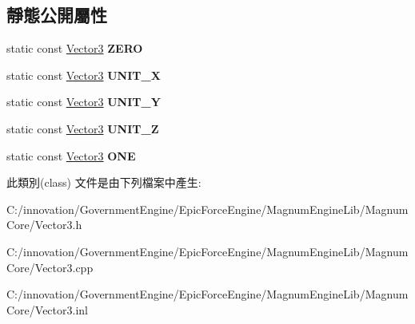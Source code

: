 \subsection*{靜態公開屬性}
\begin{DoxyCompactItemize}
\item 
static const \hyperlink{class_i_dream_sky_1_1_vector3}{Vector3} {\bfseries Z\+E\+RO}\hypertarget{class_i_dream_sky_1_1_vector3_ac97e400f736c7bb2240a6ca960290574}{}\label{class_i_dream_sky_1_1_vector3_ac97e400f736c7bb2240a6ca960290574}

\item 
static const \hyperlink{class_i_dream_sky_1_1_vector3}{Vector3} {\bfseries U\+N\+I\+T\+\_\+X}\hypertarget{class_i_dream_sky_1_1_vector3_a9012f68996a3dfebcd55a339d92a3cd0}{}\label{class_i_dream_sky_1_1_vector3_a9012f68996a3dfebcd55a339d92a3cd0}

\item 
static const \hyperlink{class_i_dream_sky_1_1_vector3}{Vector3} {\bfseries U\+N\+I\+T\+\_\+Y}\hypertarget{class_i_dream_sky_1_1_vector3_abddc6181d833976bd68b53805ee84a68}{}\label{class_i_dream_sky_1_1_vector3_abddc6181d833976bd68b53805ee84a68}

\item 
static const \hyperlink{class_i_dream_sky_1_1_vector3}{Vector3} {\bfseries U\+N\+I\+T\+\_\+Z}\hypertarget{class_i_dream_sky_1_1_vector3_a0e6f94f0b5eba93ab05ce29cafffd584}{}\label{class_i_dream_sky_1_1_vector3_a0e6f94f0b5eba93ab05ce29cafffd584}

\item 
static const \hyperlink{class_i_dream_sky_1_1_vector3}{Vector3} {\bfseries O\+NE}\hypertarget{class_i_dream_sky_1_1_vector3_ae1306872637de95c395268d326b4c4dc}{}\label{class_i_dream_sky_1_1_vector3_ae1306872637de95c395268d326b4c4dc}

\end{DoxyCompactItemize}


此類別(class) 文件是由下列檔案中產生\+:\begin{DoxyCompactItemize}
\item 
C\+:/innovation/\+Government\+Engine/\+Epic\+Force\+Engine/\+Magnum\+Engine\+Lib/\+Magnum\+Core/Vector3.\+h\item 
C\+:/innovation/\+Government\+Engine/\+Epic\+Force\+Engine/\+Magnum\+Engine\+Lib/\+Magnum\+Core/Vector3.\+cpp\item 
C\+:/innovation/\+Government\+Engine/\+Epic\+Force\+Engine/\+Magnum\+Engine\+Lib/\+Magnum\+Core/Vector3.\+inl\end{DoxyCompactItemize}
